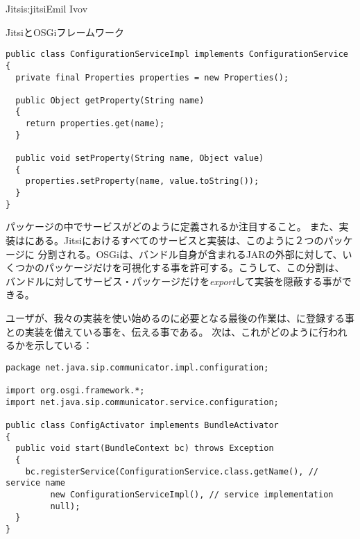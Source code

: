 \begin{aosachapter}{Jitsi}{s:jitsi}{Emil Ivov}
\begin{aosasect1}{JitsiとOSGiフレームワーク}
\begin{verbatim}
public class ConfigurationServiceImpl implements ConfigurationService
{
  private final Properties properties = new Properties();

  public Object getProperty(String name)
  {
    return properties.get(name);
  }

  public void setProperty(String name, Object value)
  {
    properties.setProperty(name, value.toString());
  }
}
\end{verbatim}

\noindent {}パッケージの中でサービスがどのように定義されるか注目すること。
また、実装はにある。Jitsiにおけるすべてのサービスと実装は、このように２つのパッケージに
分割される。OSGiは、バンドル自身が含まれるJARの外部に対して、いくつかのパッケージだけを可視化する事を許可する。こうして、この分割は、
バンドルに対してサービス・パッケージだけを\emph{export}して実装を隠蔽する事ができる。

ユーザが、我々の実装を使い始めるのに必要となる最後の作業は、に登録する事との実装を備えている事を、伝える事である。
次は、これがどのように行われるかを示している：

\begin{verbatim}
package net.java.sip.communicator.impl.configuration;

import org.osgi.framework.*;
import net.java.sip.communicator.service.configuration;

public class ConfigActivator implements BundleActivator
{
  public void start(BundleContext bc) throws Exception
  {
    bc.registerService(ConfigurationService.class.getName(), // service name
         new ConfigurationServiceImpl(), // service implementation
         null);
  }
}
\end{verbatim}


\end{aosasect1}
\end{aosachapter}
